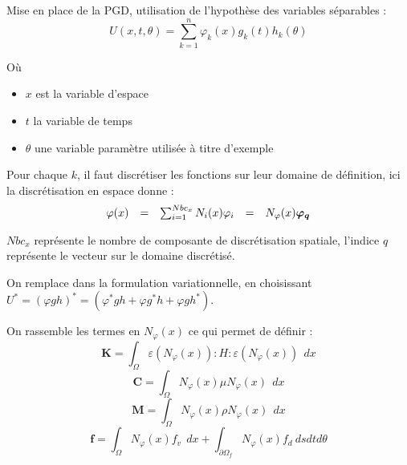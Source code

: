 \documentclass[12pt,a4paper]{report}
\begin{document}
\noindent
Mise en place de la PGD, utilisation de l'hypothèse des variables séparables :
\begin{equation}
	U(x,t,\theta) = \sum_{k=1}^n \varphi_k(x) g_k(t)h_k(\theta)
\end{equation}

\noindent
Où
\begin{itemize}
\item $x$ est la variable d'espace
\item $t$ la variable de temps
\item $\theta$ une variable paramètre utilisée à titre d'exemple
\end{itemize}
\vspace{0.3cm}

Pour chaque $k$, il faut discrétiser les fonctions sur leur domaine de définition, ici la discrétisation en espace donne : 
\begin{equation}
	\begin{array}{l c l c l}
		\varphi(x) &=& \sum_{i=1}^{Nbc_x}  N_i (x) \varphi_i &=& N_\varphi(x) \boldsymbol{\varphi_q} \\
	\end{array}
\end{equation}

$Nbc_x$ représente le nombre de composante de discrétisation spatiale, l'indice $q$ représente le vecteur sur le domaine discrétisé.

On remplace dans la formulation variationnelle, en choisissant $U^* = (\varphi gh)^* = ( \varphi^*gh+\varphi g^*h+\varphi gh^*) $.

\noindent
On rassemble les termes en $N_\varphi(x)$ ce qui permet de définir :
\begin{equation}
\mathbf{K} = \int_\Omega \varepsilon (N_\varphi(x)) : H : \varepsilon (N_\varphi(x))~~dx
\end{equation}
\begin{equation}
\mathbf{C} = \int_\Omega N_\varphi(x) \mu  N_\varphi(x)~~dx
\end{equation}
\begin{equation}
\mathbf{M} = \int_\Omega N_\varphi(x) \rho  N_\varphi(x)~~dx
\end{equation}
\begin{equation}
\mathbf{f} = \int_\Omega N_\varphi(x) f_v ~~dx 
	+ \int_{\partial \Omega_f} N_\varphi(x) f_d ~ds dt d\theta
\end{equation}
\end{document}
